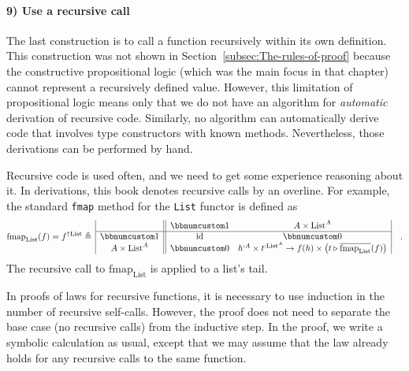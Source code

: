 \paragraph{9) Use a recursive call}

The last construction is to call a function recursively within its
own definition. This construction was not shown in Section~\ref{subsec:The-rules-of-proof}
because the constructive propositional logic (which was the main focus
in that chapter) cannot represent a recursively defined value. However,
this limitation of propositional logic means only that we do not have
an algorithm for \emph{automatic} derivation of recursive code. Similarly,
no algorithm can automatically derive code that involves type constructors
with known methods. Nevertheless, those derivations can be performed
by hand. 

Recursive code is used often, and we need to get some experience reasoning
about it. In derivations, this book denotes recursive calls by an
overline. For example, the standard \lstinline!fmap! method for the
\lstinline!List! functor is defined as
\[
\text{fmap}_{\text{List}}(f)=f^{\uparrow\text{List}}\triangleq\,\begin{array}{|c||cc|}
 & \bbnum 1 & A\times\text{List}^{A}\\
\hline \bbnum 1 & \text{id} & \bbnum 0\\
A\times\text{List}^{A} & \bbnum 0 & h^{:A}\times t^{:\text{List}^{A}}\rightarrow f(h)\times\big(t\triangleright\overline{\text{fmap}_{\text{List}}}(f)\big)
\end{array}\quad.
\]
The recursive call to $\text{fmap}_{\text{List}}$ is applied to a
list's tail.

In proofs of laws for recursive functions, it is necessary to use
induction in the number of recursive self-calls. However, the proof
does not need to separate the base case (no recursive calls) from
the inductive step. In the proof, we write a symbolic calculation
as usual, except that we may assume that the law already holds for
any recursive calls to the same function.

